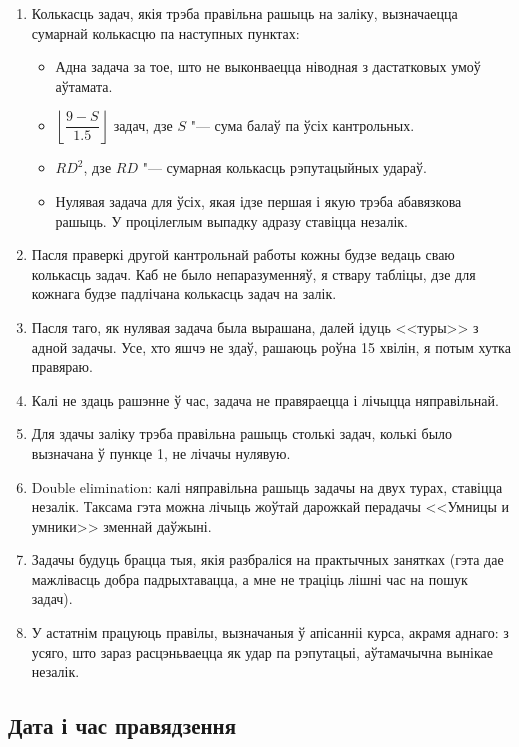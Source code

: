     \begin{enumerate}
        \item Колькасць задач, якія трэба правільна рашыць на заліку, вызначаецца сумарнай колькасцю па наступных пунктах:
        \begin{itemize}
            \item Адна задача за тое, што не выконваецца ніводная з дастатковых умоў аўтамата.
            \item $\left\lfloor \dfrac{9 - S}{1.5} \right\rfloor$ задач, дзе $S$ "--- сума балаў па ўсіх кантрольных.
            \item $RD^2$, дзе $RD$ "--- сумарная колькасць рэпутацыйных удараў.
            \item Нулявая задача для ўсіх, якая ідзе першая і якую трэба абавязкова рашыць. У процілеглым выпадку адразу ставіцца незалік.
        \end{itemize}
        \item Пасля праверкі другой кантрольнай работы кожны будзе ведаць сваю колькасць задач. Каб не было непаразуменняў, я ствару табліцы, дзе для кожнага будзе падлічана колькасць задач на залік.
        \item Пасля таго, як нулявая задача была вырашана, далей ідуць <<туры>> з адной задачы. Усе, хто яшчэ не здаў, рашаюць роўна 15 хвілін, я потым хутка правяраю. 
        \item Калі не здаць рашэнне ў час, задача не правяраецца і лічыцца няправільнай. 
        \item Для здачы заліку трэба правільна рашыць столькі задач, колькі было вызначана ў пункце 1, не лічачы нулявую.
        \item Double elimination: калі няправільна рашыць задачы на двух турах, ставіцца незалік. Таксама гэта можна лічыць жоўтай дарожкай перадачы <<Умницы и умники>> зменнай даўжыні.
        \item Задачы будуць брацца тыя, якія разбраліся на практычных занятках (гэта дае мажлівасць добра падрыхтавацца, а мне не траціць лішні час на пошук задач).
        \item У астатнім працуюць правілы, вызначаныя ў апісанніі курса, акрамя аднаго: з усяго, што зараз расцэньваецца як удар па рэпутацыі, аўтамачычна вынікае незалік.
    \end{enumerate}

    \subsection{Дата і час правядзення}
    
